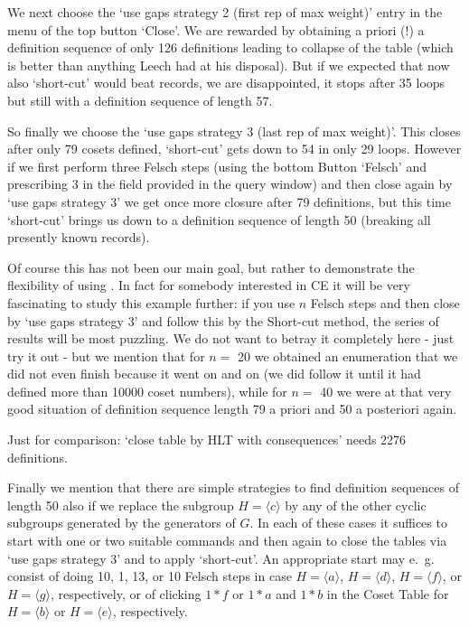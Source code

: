 We next choose the `use gaps strategy 2 (first rep of max weight)'
entry in the menu of the top button `Close'. We are rewarded by
obtaining a priori (!) a definition sequence of only 126 definitions
leading to collapse of the table (which is better than anything Leech
had at his disposal). But if we expected that now also `short-cut'
would beat records, we are disappointed, it stops after 35 loops but
still with a definition sequence of length 57.

So finally we choose the `use gaps strategy 3 (last rep of max
weight)'. This closes after only 79 cosets defined, `short-cut' gets
down to 54 in only 29 loops. However if we first perform three
Felsch steps (using the bottom Button `Felsch' and prescribing 3 in
the field provided in the query window) and then close again by `use
gaps strategy 3' we get once more closure after 79 definitions, but
this time `short-cut' brings us down to a definition sequence of
length 50 (breaking all presently known records).

Of course this has not been our main goal, but rather to demonstrate
the flexibility of using {\ITC}. In fact for somebody interested in CE
it will be very fascinating to study this example further: if you use
$n$ Felsch steps and then close by `use gaps strategy 3' and follow
this by the Short-cut method, the series of results will be most
puzzling. We do not want to betray it completely here - just try it out -
but we mention that for $n =$ 20 we obtained an enumeration that we
did not even finish because it went on and on (we did follow it until
it had defined more than 10000 coset numbers), while for $n =$ 40
we were at that very good situation of definition sequence length 79 a
priori and 50 a posteriori again.

Just for comparison: `close table by HLT with consequences' needs
2276 definitions.

Finally we mention that there are simple {\ITC} strategies to find
definition sequences of length 50 also if we replace the subgroup
$H = \langle c \rangle$ by any of the other cyclic subgroups generated
by the generators of $G$. In each of these cases it suffices to start
with one or two suitable {\ITC} commands and then again to close the
tables via `use gaps strategy 3' and to apply `short-cut'. An
appropriate start may e.~g. consist of doing 10, 1, 13, or 10
Felsch steps in case $H = \langle a \rangle$, $H = \langle d \rangle$,
$H = \langle f \rangle$, or $H = \langle g \rangle$, respectively, or
of clicking $1*f$ or $1*a$ and $1*b$ in the Coset Table for
$H = \langle b \rangle$ or $H = \langle e \rangle$, respectively.


